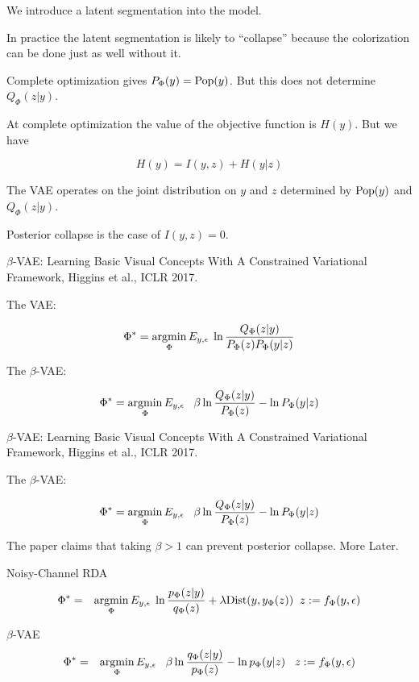 {\vfill
We introduce a latent segmentation into the model.

\vfill
In practice the latent segmentation is likely to ``collapse'' because the colorization can be done just as well without it.



\vfill
Complete optimization gives $P_\Phi(y) = \mathrm{Pop}(y)$.  But this does not determine $Q_\Phi(z|y)$.

\vfill
At complete optimization the value of the objective function is $H(y)$.  But we have

\vfill
$$H(y) = I(y,z) +       H(y|z)$$

\vfill
The VAE operates on the joint distribution on $y$ and $z$ determined by $\mathrm{Pop}(y)$ and $Q_\Phi(z|y)$.

\vfill
Posterior collapse is the case of $I(y,z) = 0$.


$\beta$-VAE: Learning Basic Visual Concepts With A
Constrained Variational Framework, Higgins et al., ICLR 2017.

\vfill
The VAE:

$$\Phi^* = \operatorname*{argmin}_\Phi E_{y,\epsilon}\;\ln \frac{Q_\Phi(z|y)}{P_\Phi(z)P_\Phi(y|z)}$$

\vfill
The $\beta$-VAE:

$$\Phi^* = \operatorname*{argmin}_\Phi E_{y,\epsilon}\;\;\;\beta \ln \frac{Q_\Phi(z|y)}{P_\Phi(z)} - \ln P_\Phi(y|z)$$


$\beta$-VAE: Learning Basic Visual Concepts With A
Constrained Variational Framework, Higgins et al., ICLR 2017.

\vfill
The $\beta$-VAE:

$$\Phi^* = \operatorname*{argmin}_\Phi E_{y,\epsilon}\;\;\;\beta \ln \frac{Q_\Phi(z|y)}{P_\Phi(z)} - \ln P_\Phi(y|z)$$

\vfill
The paper claims that taking $\beta > 1$ can prevent posterior collapse. More Later.



Noisy-Channel RDA
\begin{eqnarray*}
\Phi^* & = & \operatorname*{argmin}_\Phi E_{y,\epsilon}\;\ln \frac{p_\Phi(z|y)}{q_\Phi(z)} + \lambda \mathrm{Dist}(y,y_\Phi(z))\;\;z := f_\Phi(y,\epsilon)
\end{eqnarray*}


\vfill
$\beta$-VAE
\begin{eqnarray*}
\Phi^* & = & \operatorname*{argmin}_\Phi E_{y,\epsilon}\;\;\;\beta \ln \frac{q_\Phi(z|y)}{p_\Phi(z)} - \ln p_\Phi(y|z)\;\;\;z := f_\Phi(y,\epsilon)
\end{eqnarray*}


}
